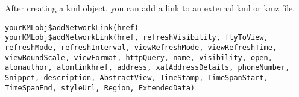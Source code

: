 \documentclass[a4paper]{book}
\begin{document}
%
\begin{Description}\relax
After creating a kml object, you can add a link to an external kml or kmz file. 
\end{Description}
%
\begin{Usage}
\begin{verbatim}
yourKMLobj$addNetworkLink(href)
yourKMLobj$addNetworkLink(href, refreshVisibility, flyToView, refreshMode, refreshInterval, viewRefreshMode, viewRefreshTime, viewBoundScale, viewFormat, httpQuery, name, visibility, open, atomauthor, atomlinkhref, address, xalAddressDetails, phoneNumber, Snippet, description, AbstractView, TimeStamp, TimeSpanStart, TimeSpanEnd, styleUrl, Region, ExtendedData)
\end{verbatim}
\end{Usage}
%
\end{document}
